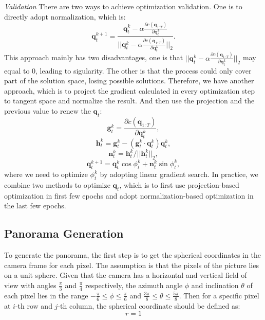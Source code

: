 \documentclass[conference]{IEEEtran}
\begin{document}
\textit{Validation}
There are two ways to achieve optimization validation. One is to directly adopt normalization, which is:
\begin{equation}
    \boldsymbol{q}_t^{k+1} = \frac{\boldsymbol{q}_t^{k} - \alpha \frac{\partial c(\boldsymbol{q}_{1:T})}
    {\partial \boldsymbol{q}_t^{k}}}{||\boldsymbol{q}_t^{k} - \alpha \frac{\partial c(\boldsymbol{q}_{1:T})}
    {\partial \boldsymbol{q}_t^{k}}||_2}.
\end{equation}
This approach mainly has two disadvantages, one is that $||\boldsymbol{q}_t^{k} - \alpha \frac{\partial c(\boldsymbol{q}_{1:T})}
    {\partial \boldsymbol{q}_t^{k}}||_2$ may equal to $0$, leading to sigularity.
The other is that the process could only cover part of the solution space,
losing possible solutions. Therefore, we have another approach, which is to project the gradient calculated in every optimization
step to tangent space and normalize the result. And then use the projection and the previous value to renew the $\boldsymbol{q}_t$:
\begin{equation}
    \boldsymbol{g}_t^k = \frac{\partial c(\boldsymbol{q}_{1:T})}{\partial \boldsymbol{q}_t^{k}},
\end{equation}
\begin{equation}
    \boldsymbol{h}_t^k = \boldsymbol{g}_t^k - (\boldsymbol{g}_t^k \cdot \boldsymbol{q}_t^k)\boldsymbol{q}_t^k,
\end{equation}
\begin{equation}
    \boldsymbol{n}_t^k = \boldsymbol{h}_t^k / ||\boldsymbol{h}_t^k||_2,
\end{equation}
\begin{equation}
    \boldsymbol{q}_t^{k+1} = \boldsymbol{q}_t^k\cos\phi_t^k + \boldsymbol{n}_t^k\sin\phi_t^k,
\end{equation}
where we need to optimize $\phi_t^k$ by adopting linear gradient search. In practice, we combine two methods to optimize $\boldsymbol{q}_t$,
which is to first use projection-based optimization in first few epochs and adopt normalization-based optimization in the last
few epochs.

\subsection{Panorama Generation}
To generate the panorama, the first step is to get the spherical coordinates in the camera frame for each pixel. The assumption
is that the pixels of the picture lies on a unit sphere. Given that the camera has a horizontal and vertical field of view with
angles $\frac{\pi}{3}$ and $\frac{\pi}{4}$ respectively, the azimuth angle $\phi$ and inclination $\theta$ of each pixel lies in
the range $-\frac{\pi}{6} \leq \phi \leq \frac{\pi}{6}$ and $\frac{3\pi}{8} \leq \theta \leq \frac{5\pi}{8}$. Then for a specific
pixel at $i$-th row and $j$-th column, the spherical coordinate should be defined as:
\begin{equation}
    r = 1
\end{equation}
\end{document}
